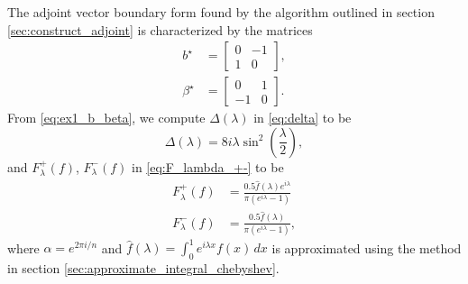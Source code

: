 \documentclass[11pt, oneside, a4paper]{article}
\begin{document}
The adjoint vector boundary form found by the algorithm outlined in section \ref{sec:construct_adjoint} is characterized by the matrices
\begin{subequations}\label{eq:ex1_b_beta}
\begin{align}
    b^\star &= \begin{bmatrix}0&-1\\ 1&0\end{bmatrix},\\
    \beta^\star &= \begin{bmatrix}0&1\\ -1&0\end{bmatrix}.
\end{align}
\end{subequations}
From \eqref{eq:ex1_b_beta}, we compute $\Delta(\lambda)$ in \eqref{eq:delta} to be 
\begin{equation}\label{eq:ex1_delta}
    \Delta(\lambda) = 8i\lambda \sin^2\left(\frac{\lambda}{2}\right),
\end{equation}
and $F_\lambda^+(f)$, $F_\lambda^-(f)$ in \eqref{eq:F_lambda_+-} to be
\begin{subequations}\label{eq:ex1_F_lambda_+-}
    \begin{align}
        F_\lambda^+(f) &= \frac{0.5\hat{f}(\lambda)e^{i\lambda}}{\pi(e^{i\lambda}-1)}\\
    F_\lambda^-(f) &= \frac{0.5\hat{f}(\lambda)}{\pi(e^{i\lambda}-1)},
    \end{align}
\end{subequations}
where $\alpha = e^{2\pi i/n}$ and $\hat{f}(\lambda)=\int_0^1 e^{i\lambda x}f(x)\,dx$ is approximated using the method in section \ref{sec:approximate_integral_chebyshev}.
\end{document}
